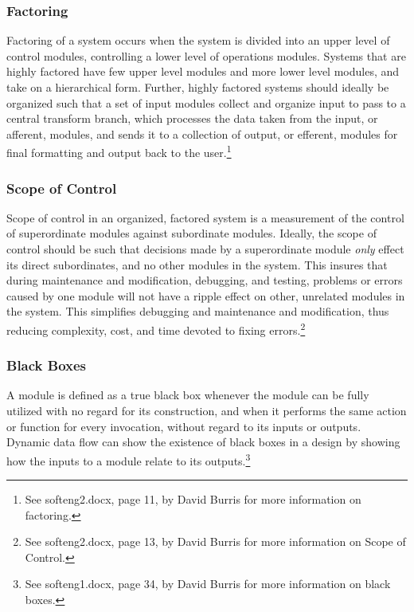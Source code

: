 \documentclass{article}
\begin{document}
		\subsubsection{Factoring}
			Factoring of a system occurs when the system is divided into an upper level of control modules, controlling a lower level of operations modules. Systems that are highly factored have few upper level modules and more lower level modules, and take on a hierarchical form. Further, highly factored systems should ideally be organized such that a set of input modules collect and organize input to pass to a central transform branch, which processes the data taken from the input, or afferent, modules, and sends it to a collection of output, or efferent, modules for final formatting and output back to the user.\footnote{See softeng2.docx, page 11, by David Burris for more information on factoring.} 
		\subsubsection{Scope of Control}
			Scope of control in an organized, factored system is a measurement of the control of superordinate modules against subordinate modules. Ideally, the scope of control should be such that decisions made by a superordinate module \emph{only} effect its direct subordinates, and no other modules in the system. This insures that during maintenance and modification, debugging, and testing, problems or errors caused by one module will not have a ripple effect on other, unrelated modules in the system. This simplifies debugging and maintenance and modification, thus reducing complexity, cost, and time devoted to fixing errors.\footnote{See softeng2.docx, page 13, by David Burris for more information on Scope of Control.}  
		\subsubsection{Black Boxes}
			A module is defined as a true black box whenever the module can be fully utilized with no regard for its construction, and when it performs the same action or function for every invocation, without regard to its inputs or outputs. Dynamic data flow can show the existence of black boxes in a design by showing how the inputs to a module relate to its outputs.\footnote{See softeng1.docx, page 34, by David Burris for more information on black boxes.} 
\end{document}
